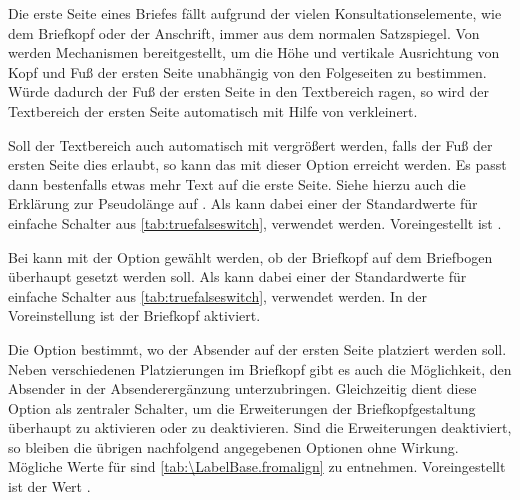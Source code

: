 \begin{Declaration}
\end{Declaration}
\begin{Explain}
  Die erste Seite eines Briefes fällt %
  \iftrue %
    aufgrund der vielen Konsultationselemente, wie dem Briefkopf oder der
    Anschrift,
  \fi %
  immer aus dem normalen Satzspiegel. Von  werden Mechanismen
  bereitgestellt, um die Höhe und vertikale Ausrichtung von Kopf und Fuß der
  ersten Seite unabhängig von den Folgeseiten zu bestimmen. Würde dadurch der
  Fuß der ersten Seite in den Textbereich ragen, so wird
  der Textbereich der ersten Seite automatisch mit Hilfe von
   verkleinert. 
\end{Explain}
Soll der Textbereich auch automatisch mit  vergrößert
werden, falls der Fuß der ersten Seite dies erlaubt, so kann das mit dieser
Option erreicht werden. Es passt dann bestenfalls etwas mehr Text auf die
erste Seite.  Siehe hierzu auch die Erklärung zur Pseudolänge
 auf
. Als
 kann dabei einer der Standardwerte für einfache Schalter
aus \autoref{tab:truefalseswitch},  verwendet
werden. Voreingestellt ist .%
%
\EndIndexGroup


\begin{Declaration}
\end{Declaration}
\iffalse%
Das\ChangedAt{v2.97e}{\Class{scrlttr2}} oberste Element eines Briefbogens ist
normalerweise der Briefkopf. Bei
\else%
Bei
\fi%
\KOMAScript{} kann mit der Option
 gewählt werden, ob der Briefkopf auf dem Briefbogen
überhaupt gesetzt werden soll. Als  kann dabei einer der
Standardwerte für einfache Schalter aus \autoref{tab:truefalseswitch},
 verwendet werden. In der Voreinstellung ist
der Briefkopf aktiviert.%
%
\EndIndexGroup


\begin{Declaration}
\end{Declaration}
%
Die Option  bestimmt, wo der
Absender auf der ersten Seite platziert werden soll. Neben
verschiedenen Platzierungen im Briefkopf gibt es
auch die Möglichkeit, den Absender in der
Absenderergänzung
unterzubringen. Gleichzeitig dient diese Option als
zentraler Schalter, um die Erweiterungen der Briefkopfgestaltung überhaupt zu
aktivieren oder zu deaktivieren. Sind die Erweiterungen deaktiviert, so
bleiben die übrigen nachfolgend angegebenen Optionen ohne Wirkung. Mögliche
Werte für  sind \autoref{tab:\LabelBase.fromalign} zu
entnehmen. Voreingestellt ist der Wert .%
%
\EndIndexGroup

